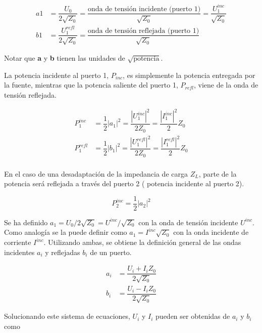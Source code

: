 \begin{equation}
\begin{aligned}
	a1 &= \dfrac{U_0}{2\sqrt{Z_0}}= \dfrac{\textrm{onda de tensión incidente (puerto 1)}}{\sqrt{Z_0}}=\dfrac{U_1^{inc}}{\sqrt{Z_0}} \\
	b1 &= \dfrac{U_1^{refl}}{2\sqrt{Z_0}}= \dfrac{\textrm{onda de tensión reflejada (puerto 1)}}{\sqrt{Z_0}}
\end{aligned}
\end{equation}

Notar que \textbf{a} y \textbf{b} tienen las unidades de $\sqrt{\textrm{potencia}}$.

La potencia incidente al puerto 1, $P_{inc}$, es simplemente la potencia entregada por la fuente, mientras que la potencia saliente
del puerto 1, $P_{refl}$, viene de la onda de tensión reflejada.

\begin{equation}
\begin{aligned}
	P_1^{inc} &= \dfrac{1}{2}|a_1|^2= \dfrac{|U_1^{inc}|^2}{2Z_0}=\dfrac{|I_1^{inc}|^2}{2}Z_0 \\
	P_1^{refl} &= \dfrac{1}{2}|b_1|^2= \dfrac{|U_1^{refl}|^2}{2Z_0}=\dfrac{|I_1^{refl}|^2}{2}Z_0 \\
\end{aligned}
\end{equation}

En el caso de una desadaptación de la impedancia de carga $Z_L$, parte de la potencia será reflejada a través del puerto 2 (
potencia incidente al puerto 2).

$$
P_2^{inc}=\dfrac{1}{2}|a_2|^2
$$

Se ha definido $a_1 = U_0/2\sqrt{Z_0} = U^{inc}/\sqrt{Z_0}$ con la onda de tensión incidente $U^{inc}$. Como analogía
se la puede definir como $a_1 = I^{inc}\sqrt{Z_0}$ con la onda incidente de corriente $I^{inc}$. Utilizando ambas, se obtiene la
definición general de las ondas incidentes $a_i$ y reflejadas $b_i$ de un puerto.

\begin{equation}
\begin{aligned}
	a_i &= \dfrac{U_i + I_iZ_0}{2\sqrt{Z_0}} \\
	b_i &= \dfrac{U_i - I_iZ_0}{2\sqrt{Z_0}}
\end{aligned}
\label{eq:waves}
\end{equation}

Solucionando este sistema de ecuaciones, $U_i$ y $I_i$ pueden ser obtenidas de $a_i$ y $b_i$ como

